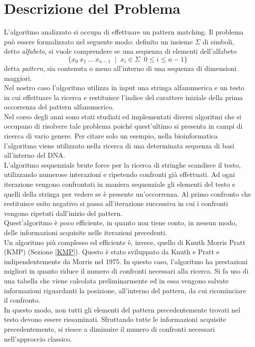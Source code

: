 \chapter{Descrizione del Problema}
L'algoritmo analizzato si occupa di effettuare un pattern matching. Il problema può essere formalizzato nel seguente modo: definito un insieme $\Sigma$ di simboli, detto {\itshape alfabeto}, si vuole comprendere se una sequenza di elementi dell'alfabeto $$\{x_0\:x_1\: ...\:x_{n-1} \;\; | \;\; x_i \in \Sigma\;\; 0\le i \le n-1\}$$ detta {\itshape pattern}, sia contenuta o meno all'interno di una sequenza di dimensioni maggiori.\\ Nel nostro caso l'algoritmo utilizza in input una stringa alfanumerica e un testo in cui effettuare la ricerca e restituisce l'indice del carattere iniziale della prima occorrenza del pattern alfanumerico.\\ 
Nel corso degli anni sono stati studiati ed implementati diversi algoritmi che si occupano di risolvere tale problema poiché quest'ultimo si presenta in campi di ricerca di vario genere. Per citare solo un esempio, nella bioinformatica l'algoritmo viene utilizzato nella ricerca di una determinata sequenza di basi all'interno del DNA.\\
L'algoritmo sequenziale brute force per la ricerca di stringhe scandisce il testo, utilizzando numerose interazioni e ripetendo confronti già effettuati. Ad ogni iterazione vengono confrontati in maniera sequenziale gli elementi del testo e quelli della stringa per vedere se è presente un'occorrenza. Al primo confronto che restituisce esito negativo si passa all'iterazione successiva in cui i confronti vengono ripetuti dall'inizio del pattern.\\ Quest'algoritmo è poco efficiente, in quanto non tiene conto, in nessun modo, delle informazioni acquisite nelle iterazioni precedenti. \\
Un algoritmo più complesso ed efficiente è, invece, quello di Knuth Morris Pratt (KMP) (Sezione \ref{KMP}). Questo è stato sviluppato da Knuth e Pratt e indipendentemente da Morris nel 1975. In questo caso, l'algoritmo ha prestazioni migliori in quanto riduce il numero di confronti necessari alla ricerca. Si fa uso di una tabella che viene calcolata preliminarmente ed in essa vengono salvate informazioni riguardanti la posizione, all'interno del pattern, da cui ricominciare il confronto. \\
In questo modo, non tutti gli elementi del pattern precedentemente trovati nel testo devono essere riesaminati. Sfruttando tutte le informazioni acquisite precedentemente, si riesce a diminuire il numero di confronti necessari nell'approccio classico.\\
